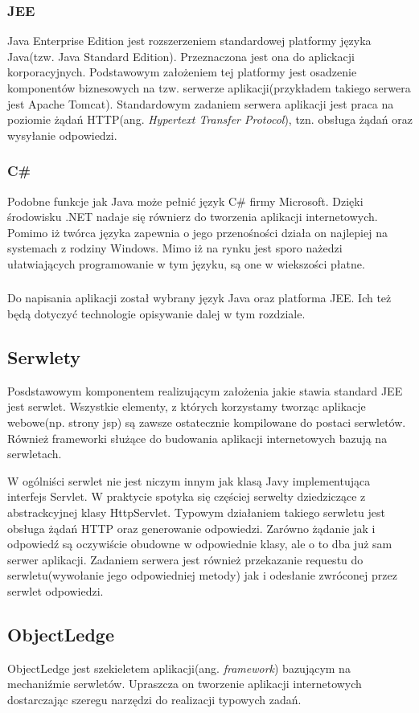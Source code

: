 \subsubsection{JEE}
Java Enterprise Edition jest rozszerzeniem standardowej platformy języka Java(tzw. Java Standard Edition). Przeznaczona jest ona do aplickacji korporacyjnych. Podstawowym założeniem tej platformy jest osadzenie komponentów biznesowych na tzw. serwerze aplikacji(przykładem takiego serwera jest Apache Tomcat). Standardowym zadaniem serwera aplikacji jest praca na poziomie żądań HTTP(ang. \textit{Hypertext Transfer Protocol}), tzn. obsługa żądań oraz wysyłanie odpowiedzi.

\subsubsection{C\#}
Podobne funkcje jak Java może pełnić język C\# firmy Microsoft. Dzięki środowisku .NET nadaje się równierz do tworzenia aplikacji internetowych. Pomimo iż twórca języka zapewnia o jego przenośności działa on najlepiej na systemach z rodziny Windows. Mimo iż na rynku jest sporo nażedzi ułatwiających programowanie w tym języku, są one w wiekszości płatne.

\subsubsection{}
Do napisania aplikacji został wybrany język Java oraz platforma JEE. Ich też będą dotyczyć technologie opisywanie dalej w tym rozdziale.

\subsection[Serwlety][Serwlety]{Serwlety}
Posdstawowym komponentem realizującym założenia jakie stawia standard JEE jest serwlet. Wszystkie elementy, z których korzystamy tworząc aplikacje webowe(np. strony jsp) są zawsze ostatecznie kompilowane do postaci serwletów. Również frameworki służące do budowania aplikacji internetowych bazują na serwletach.

W ogólniści serwlet nie jest niczym innym jak klasą Javy implementująca interfejs Servlet. W praktycie spotyka się częściej serwelty dziedziczące z abstrackcyjnej klasy HttpServlet. Typowym działaniem takiego serwletu jest obsługa żądań HTTP oraz generowanie odpowiedzi. Zarówno żądanie jak i odpowiedź są oczywiście obudowne w odpowiednie klasy, ale o to dba już sam serwer aplikacji. Zadaniem serwera jest również przekazanie requestu do serwletu(wywołanie jego odpowiedniej metody) jak i odesłanie zwróconej przez serwlet odpowiedzi.

\subsection[ObjectLedge][ObjectLedge]{ObjectLedge}
ObjectLedge jest szekieletem aplikacji(ang. \textit{framework}) bazującym na mechaniźmie serwletów. Upraszcza on tworzenie aplikacji internetowych dostarczając szeregu narzędzi do realizacji typowych zadań. 








